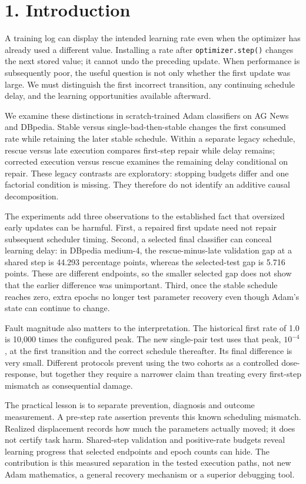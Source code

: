 \documentclass[smallextended]{svjour3}
\begin{document}
\section{1. Introduction}\label{introduction}

A training log can display the intended learning rate even when the optimizer has already used a different value. Installing a rate after \texttt{optimizer.step()} changes the next stored value; it cannot undo the preceding update. When performance is subsequently poor, the useful question is not only whether the first update was large. We must distinguish the first incorrect transition, any continuing schedule delay, and the learning opportunities available afterward.

We examine these distinctions in scratch-trained Adam classifiers on AG News and DBpedia. Stable versus single-bad-then-stable changes the first consumed rate while retaining the later stable schedule. Within a separate legacy schedule, rescue versus late execution compares first-step repair while delay remains; corrected execution versus rescue examines the remaining delay conditional on repair. These legacy contrasts are exploratory: stopping budgets differ and one factorial condition is missing. They therefore do not identify an additive causal decomposition.

The experiments add three observations to the established fact that oversized early updates can be harmful. First, a repaired first update need not repair subsequent scheduler timing. Second, a selected final classifier can conceal learning delay: in DBpedia medium-4, the rescue-minus-late validation gap at a shared step is 44.293 percentage points, whereas the selected-test gap is 5.716 points. These are different endpoints, so the smaller selected gap does not show that the earlier difference was unimportant. Third, once the stable schedule reaches zero, extra epochs no longer test parameter recovery even though Adam's state can continue to change.

Fault magnitude also matters to the interpretation. The historical first rate of 1.0 is 10,000 times the configured peak. The new single-pair test uses that peak, \(10^{-4}\), at the first transition and the correct schedule thereafter. Its final difference is very small. Different protocols prevent using the two cohorts as a controlled dose-response, but together they require a narrower claim than treating every first-step mismatch as consequential damage.

The practical lesson is to separate prevention, diagnosis and outcome measurement. A pre-step rate assertion prevents this known scheduling mismatch. Realized displacement records how much the parameters actually moved; it does not certify task harm. Shared-step validation and positive-rate budgets reveal learning progress that selected endpoints and epoch counts can hide. The contribution is this measured separation in the tested execution paths, not new Adam mathematics, a general recovery mechanism or a superior debugging tool.
\end{document}
